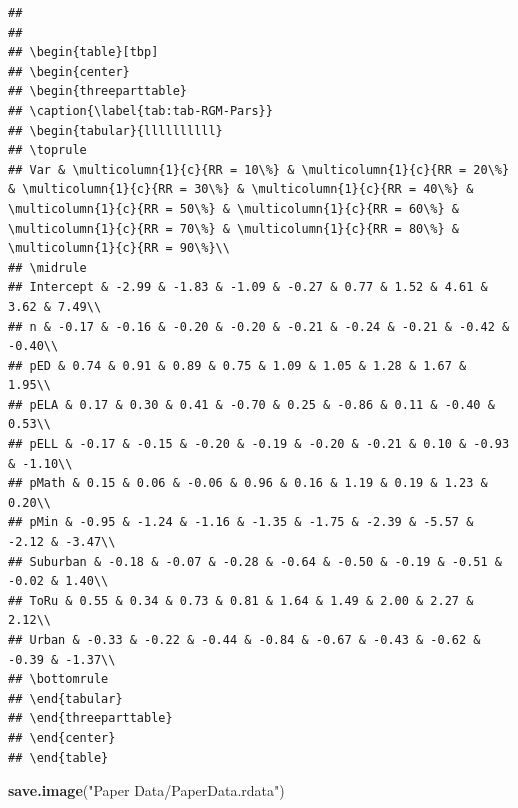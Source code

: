 \documentclass[man]{apa6}
\newenvironment{Shaded}{\begin{snugshade}}{\end{snugshade}}
\newcommand{\KeywordTok}[1]{\textcolor[rgb]{0.13,0.29,0.53}{\textbf{#1}}}
\newcommand{\NormalTok}[1]{#1}
\newcommand{\StringTok}[1]{\textcolor[rgb]{0.31,0.60,0.02}{#1}}
\begin{document}
\begin{verbatim}
## 
## 
## \begin{table}[tbp]
## \begin{center}
## \begin{threeparttable}
## \caption{\label{tab:tab-RGM-Pars}}
## \begin{tabular}{llllllllll}
## \toprule
## Var & \multicolumn{1}{c}{RR = 10\%} & \multicolumn{1}{c}{RR = 20\%} & \multicolumn{1}{c}{RR = 30\%} & \multicolumn{1}{c}{RR = 40\%} & \multicolumn{1}{c}{RR = 50\%} & \multicolumn{1}{c}{RR = 60\%} & \multicolumn{1}{c}{RR = 70\%} & \multicolumn{1}{c}{RR = 80\%} & \multicolumn{1}{c}{RR = 90\%}\\
## \midrule
## Intercept & -2.99 & -1.83 & -1.09 & -0.27 & 0.77 & 1.52 & 4.61 & 3.62 & 7.49\\
## n & -0.17 & -0.16 & -0.20 & -0.20 & -0.21 & -0.24 & -0.21 & -0.42 & -0.40\\
## pED & 0.74 & 0.91 & 0.89 & 0.75 & 1.09 & 1.05 & 1.28 & 1.67 & 1.95\\
## pELA & 0.17 & 0.30 & 0.41 & -0.70 & 0.25 & -0.86 & 0.11 & -0.40 & 0.53\\
## pELL & -0.17 & -0.15 & -0.20 & -0.19 & -0.20 & -0.21 & 0.10 & -0.93 & -1.10\\
## pMath & 0.15 & 0.06 & -0.06 & 0.96 & 0.16 & 1.19 & 0.19 & 1.23 & 0.20\\
## pMin & -0.95 & -1.24 & -1.16 & -1.35 & -1.75 & -2.39 & -5.57 & -2.12 & -3.47\\
## Suburban & -0.18 & -0.07 & -0.28 & -0.64 & -0.50 & -0.19 & -0.51 & -0.02 & 1.40\\
## ToRu & 0.55 & 0.34 & 0.73 & 0.81 & 1.64 & 1.49 & 2.00 & 2.27 & 2.12\\
## Urban & -0.33 & -0.22 & -0.44 & -0.84 & -0.67 & -0.43 & -0.62 & -0.39 & -1.37\\
## \bottomrule
## \end{tabular}
## \end{threeparttable}
## \end{center}
## \end{table}
\end{verbatim}

\begin{Shaded}
\begin{Highlighting}[]
\KeywordTok{save.image}\NormalTok{(}\StringTok{"Paper Data/PaperData.rdata"}\NormalTok{)}
\end{Highlighting}
\end{Shaded}
\end{document}
